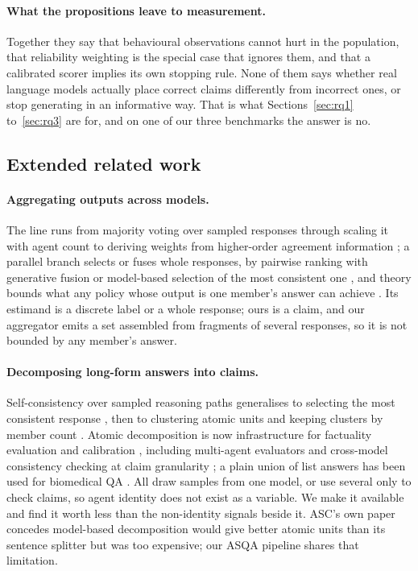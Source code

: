 \documentclass{article}
\begin{document}
\paragraph{What the propositions leave to measurement.}
Together they say that behavioural observations cannot hurt in the population, that reliability weighting is the special case that ignores them, and that a calibrated scorer implies its own stopping rule. None of them says whether real language models actually place correct claims differently from incorrect ones, or stop generating in an informative way. That is what Sections~\ref{sec:rq1} to~\ref{sec:rq3} are for, and on one of our three benchmarks the answer is no.


\subsection{Extended related work}
\label{app:related}

\paragraph{Aggregating outputs across models.}
The line runs from majority voting over sampled responses \cite{wang2022self} through scaling it with agent count \cite{li2024agents} to deriving weights from higher-order agreement information \cite{ai2025majority}; a parallel branch selects or fuses whole responses, by pairwise ranking with generative fusion \cite{jiang2023llm} or model-based selection of the most consistent one \cite{chen2023universal}, and theory bounds what any policy whose output is one member's answer can achieve \cite{ananthakrishnan2026power}. Its estimand is a discrete label or a whole response; ours is a claim, and our aggregator emits a set assembled from fragments of several responses, so it is not bounded by any member's answer.

\paragraph{Decomposing long-form answers into claims.}
Self-consistency over sampled reasoning paths \cite{wang2022self} generalises to selecting the most consistent response \cite{chen2023universal}, then to clustering atomic units and keeping clusters by member count \cite{thirukovalluru2024atomic}. Atomic decomposition is now infrastructure for factuality evaluation and calibration \cite{zhang2024atomic}, including multi-agent evaluators \cite{ning2025mad,wan2025fastfact,liu2025verifact} and cross-model consistency checking at claim granularity \cite{goel2025zero}; a plain union of list answers has been used for biomedical QA \cite{panou2025harnessing}. All draw samples from one model, or use several only to check claims, so agent identity does not exist as a variable. We make it available and find it worth less than the non-identity signals beside it. ASC's own paper concedes model-based decomposition would give better atomic units than its sentence splitter but was too expensive; our ASQA pipeline shares that limitation.
\end{document}
